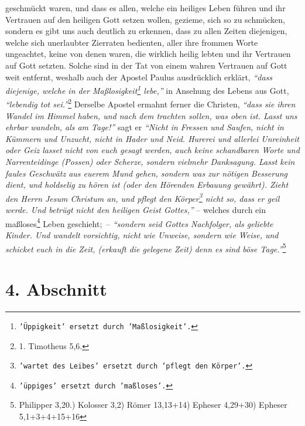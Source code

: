 geschmückt waren,
und dass es allen, welche ein heiliges Leben führen und ihr Vertrauen auf den
heiligen Gott setzen wollen, gezieme, sich so zu schmücken, sondern es gibt uns
auch deutlich zu erkennen, dass zu allen Zeiten diejenigen, welche sich
unerlaubter Zierraten bedienten, aller ihre frommen Worte ungeachtet, keine von
denen waren, die wirklich heilig lebten und ihr Vertrauen auf Gott setzten.
Solche sind in der Tat von einem wahren Vertrauen auf Gott weit entfernt,
weshalb auch der Apostel Paulus ausdrücklich erklärt,
\textit{"`dass diejenige, welche
in der Maßlosigkeit\footnote{\texttt{'Üppigkeit' ersetzt durch 'Maßlosigkeit'.}}
lebe,"'} in
Ansehung des Lebens aus Gott,
\textit{"`lebendig tot sei."'}\footnote{1. Timotheus 5,6.}
Derselbe Apostel ermahnt ferner die Christen,
\textit{"`dass sie ihren Wandel im Himmel haben, und nach dem trachten sollen,
was oben
ist. Lasst uns ehrbar wandeln, als am Tage!"'} sagt er
\textit{"`Nicht in Fressen und
Saufen, nicht in Kümmern und Unzucht, nicht in Hader und Neid. Hurerei und
allerlei Unreinheit oder Geiz lasset nicht von euch gesagt werden, auch keine
schandbaren Worte und Narrenteidinge (Possen) oder Scherze, sondern vielmehr
Danksagung. Lasst kein faules Geschwätz aus euerem Mund gehen, sondern was zur
nötigen Besserung dient, und holdselig zu hören ist (oder den Hörenden
Erbauung gewährt). Zieht den Herrn Jesum Christum an, und pflegt den
Körper\footnote{\texttt{'wartet des Leibes'
ersetzt durch 'pflegt den Körper'.}}
nicht so, dass er geil werde. Und betrügt nicht den heiligen Geist Gottes,"'} --
welches durch ein maßloses\footnote{\texttt{'üppiges' ersetzt durch 'maßloses'.}}
Leben geschieht;~--
\textit{"`sondern seid Gottes Nachfolger,
als geliebte Kinder. Und wandelt vorsichtig, nicht wie Unweise, sondern wie
Weise, und schicket euch in die Zeit, (erkauft die gelegene Zeit) denn es sind
böse Tage."'}\footnote{Philipper 3,20.) Kolosser 3,2) Römer 13,13+14) Epheser
4,29+30) Epheser 5,1+3+4+15+16}

\section{4. Abschnitt} \label{kap15_ab4}

